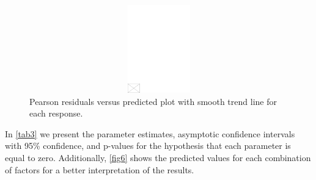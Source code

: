\documentclass[AMA,STIX1COL]{WileyNJD-v2}
\begin{document}
\begin{figure}[h]
\centerline{\includegraphics[width=342pt,height=9pc,draft]{empty}}
\caption{Pearson residuals versus predicted plot with smooth trend line for each response.\label{fig5}}
\end{figure}

In \autoref{tab3} we present the parameter estimates, asymptotic confidence intervals with 95\% confidence, and p-values for the hypothesis that each parameter is equal to zero. Additionally, \autoref{fig6} shows the predicted values for each combination of factors for a better interpretation of the results.
\end{document}
